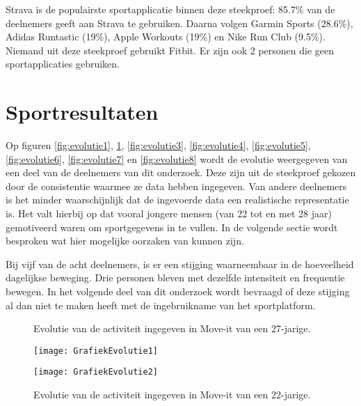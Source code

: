 Strava is de populairste sportapplicatie binnen deze steekproef: 85.7\% van de deelnemers geeft aan Strava te gebruiken. Daarna volgen Garmin Sports (28.6\%), Adidas Runtastic (19\%), Apple Workouts (19\%) en Nike Run Club (9.5\%). Niemand uit deze steekproef gebruikt Fitbit. Er zijn ook 2 personen die geen sportapplicaties gebruiken.

\section{Sportresultaten}

Op figuren \ref{fig:evolutie1}, \ref{fig:evolutie2}, \ref{fig:evolutie3}, \ref{fig:evolutie4}, \ref{fig:evolutie5}, \ref{fig:evolutie6}, \ref{fig:evolutie7} en \ref{fig:evolutie8} wordt de evolutie weergegeven van een deel van de deelnemers van dit onderzoek. Deze zijn uit de steekproef gekozen door de consistentie waarmee ze data hebben ingegeven. Van andere deelnemers is het minder waarschijnlijk dat de ingevoerde data een realistische representatie is. Het valt hierbij op dat vooral jongere mensen (van 22 tot en met 28 jaar) gemotiveerd waren om sportgegevens in te vullen. In de volgende sectie wordt besproken wat hier mogelijke oorzaken van kunnen zijn.

Bij vijf van de acht deelnemers, is er een stijging waarneembaar in de hoeveelheid dagelijkse beweging. Drie personen bleven met dezelfde intensiteit en frequentie bewegen. In het volgende deel van dit onderzoek wordt bevraagd of deze stijging al dan niet te maken heeft met de ingebruikname van het sportplatform.

\begin{figure}[htbp]
    \begin{minipage}[t]{0.48\linewidth} %
        \centering
        \caption[Evolutie van de activiteit van een 27-jarige]{Evolutie van de activiteit ingegeven in Move-it van een 27-jarige.}
        \texttt{[image: GrafiekEvolutie1]}
        \label{fig:evolutie1}
    \end{minipage}
    \hfill
    \begin{minipage}[t]{0.48\linewidth} %
        \centering
        \caption[Evolutie van de activiteit van een 22-jarige]{Evolutie van de activiteit ingegeven in Move-it van een 22-jarige.}
        \texttt{[image: GrafiekEvolutie2]}
        \label{fig:evolutie2}
    \end{minipage}
\end{figure}

